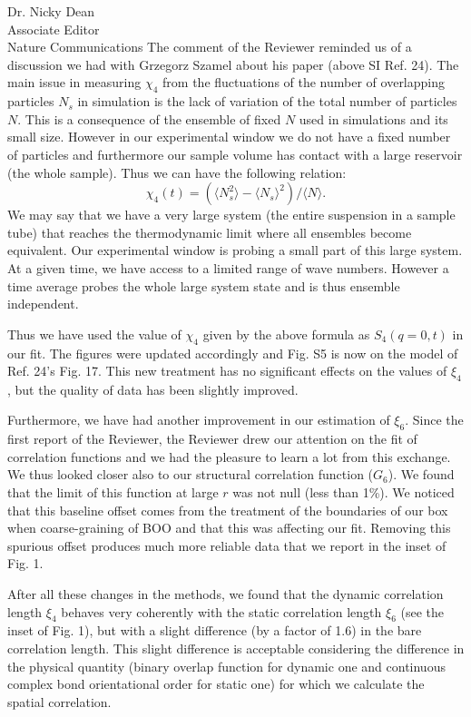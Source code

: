\documentclass[a4paper, rebuttal, parskip=true, firsthead=false, fromemail=true, foldmarks=false]{scrlttr2}
\begin{document}
\begin{letter}{Dr. Nicky Dean\\
Associate Editor\\
Nature Communications}
The comment of the Reviewer reminded us of a discussion we had with Grzegorz Szamel about his paper (above SI Ref. 24). The main issue in measuring $\chi_4$ from the fluctuations of the number of overlapping particles $N_s$ in simulation is the lack of variation of the total number of particles $N$. This is a consequence of the ensemble of fixed $N$ used in simulations and its small size. However in our experimental window we do not have a fixed number of particles and furthermore our sample volume has contact with a large reservoir 
(the whole sample). Thus we can have the following relation:
\[
\chi_4(t) = (\langle N_s^2\rangle - \langle N_s\rangle^2) /  \langle N\rangle. 
\]
We may say that we have a very large system (the entire suspension in a sample tube) that reaches the thermodynamic limit where all ensembles become equivalent. Our experimental window is probing a small part of this large system. At a given time, we have access to a limited range of wave numbers. However a time average probes the whole large system state and is thus ensemble independent. 

Thus we have used the value of $\chi_4$ given by the above formula as $S_4(q=0,t)$ in our fit. The figures were updated accordingly and Fig. S5 is now on the model of Ref. 24's Fig. 17. This new treatment has no significant effects on the values of $\xi_4$, but the quality of data has been slightly improved. 

Furthermore, we have had another improvement in our estimation of $\xi_6$. Since the first report of the Reviewer, the Reviewer drew our attention on the fit of correlation functions and we had the pleasure to learn a lot from this exchange. We thus looked closer also to our structural correlation function ($G_6$). We found that the limit of this function at large $r$ was not null (less than 1\%). We noticed that this baseline offset comes from the treatment of the boundaries of our box when coarse-graining of BOO and that this was affecting our fit. Removing this spurious offset produces much more reliable data that we report in the inset of Fig. 1. 

After all these changes in the methods, we found that the dynamic correlation length $\xi_4$ behaves very coherently with the static correlation length $\xi_6$ 
(see the inset of Fig. 1), but with a slight difference (by a factor of 1.6) in the bare correlation length. This slight difference is acceptable considering the difference in the 
physical quantity (binary overlap function for dynamic one and continuous complex bond orientational order for static one) for which we calculate the spatial correlation.  


\end{letter}
\end{document}
